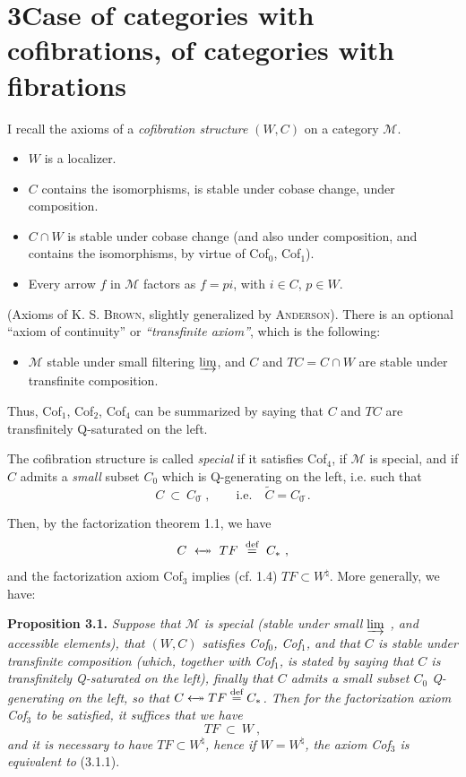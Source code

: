 \documentclass[11pt]{article}
\newcommand{\printedpage}[1]{\marginpar{\footnotesize p.~#1}}
\newcommand{\msp}[1]{\marginpar{\footnotesize [#1]}}
\newcommand{\M}{\mathcal{M}}
\newcommand{\deq}{\overset{\text{def}}{=}}
\newcommand{\Qs}{\tilde{\ }}
\newcommand{\fact}{\mathrel{\leftarrow\mkern-11mu\twoheadrightarrow}}
\begin{document}
\msp{page 33}

\section*{3\quad Case of categories with cofibrations, of categories with fibrations}

I recall the axioms of a \textit{cofibration structure} $(W,C)$ on a category $\M$.

\begin{itemize}[leftmargin=4em,labelwidth=3.5em,align=left]
\item[Cof$_0$ :] $W$ is a localizer.
\item[Cof$_1$ :] $C$ contains the isomorphisms, is stable under cobase change, under composition.
\item[Cof$_2$ :] $C\cap W$ is stable under cobase change (and also under composition, and contains the isomorphisms, by virtue of Cof$_0$, Cof$_1$).
\item[Cof$_3$ :] Every arrow $f$ in $\M$ factors as $f=pi$, with $i\in C$, $p\in W$.
\end{itemize}

(Axioms of K. S. \textsc{Brown}, slightly generalized by \textsc{Anderson}). There is an optional ``axiom
\printedpage{20}
of continuity'' or \textit{``transfinite axiom''}, which is the following:

\begin{itemize}[leftmargin=4em,labelwidth=3.5em,align=left]
\item[Cof$_4$ :] $\M$ stable under small filtering $\varinjlim$, and $C$ and $TC = C\cap W$ are stable under transfinite composition.
\end{itemize}

Thus, Cof$_1$, Cof$_2$, Cof$_4$ can be summarized by saying that $C$ and $TC$ are transfinitely Q-saturated on the left.

The cofibration structure is called \textit{special} if it satisfies Cof$_4$, if $\M$ is special, and if $C$ admits a \textit{small} subset $C_0$ which is Q-generating on the left, i.e. such that
\[
C \ \subset\ C_0\Qs\,, \qquad \text{i.e.}\quad \tilde{C}=C_0\Qs. \tag*{(3.1)}
\]

\msp{page 34}
Then, by the factorization theorem 1.1, we have
\[
C \ \fact\ TF \ \deq\ C_* \ ,
\]
and the factorization axiom Cof$_3$ implies (cf. 1.4) $TF\subset W^{\natural}$. More generally, we have:

\textbf{Proposition 3.1.} \textit{Suppose that $\M$ is special (stable under small $\varinjlim$ , and accessible elements), that $(W,C)$ satisfies Cof$_0$, Cof$_1$, and that $C$ is stable under transfinite composition (which, together with Cof$_1$, is stated by saying that $C$ is transfinitely Q-saturated on the left), finally that $C$ admits a small subset $C_0$ Q-generating on the left, so that $C\fact TF\deq C_*$. Then for the factorization axiom Cof$_3$ to be satisfied, it suffices that we have}
\[
TF \ \subset\ W \ , \tag*{(3.1.1)}
\]
\textit{and it is necessary to have $TF\subset W^{\natural}$, hence if $W=W^{\natural}$, the axiom Cof$_3$ is equivalent to} (3.1.1).
\end{document}
